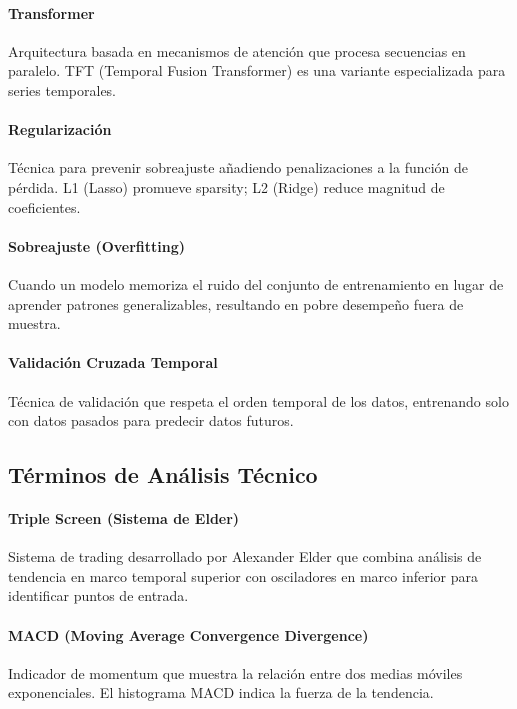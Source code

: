 \documentclass[11pt,a4paper]{article}
\begin{document}
\paragraph{Transformer} \label{glos:transformer}
Arquitectura basada en mecanismos de atención que procesa secuencias en paralelo. TFT (Temporal Fusion Transformer) es una variante especializada para series temporales.

\paragraph{Regularización} \label{glos:regularizacion}
Técnica para prevenir sobreajuste añadiendo penalizaciones a la función de pérdida. L1 (Lasso) promueve sparsity; L2 (Ridge) reduce magnitud de coeficientes.

\paragraph{Sobreajuste (Overfitting)} \label{glos:overfitting}
Cuando un modelo memoriza el ruido del conjunto de entrenamiento en lugar de aprender patrones generalizables, resultando en pobre desempeño fuera de muestra.

\paragraph{Validación Cruzada Temporal} \label{glos:cv-temporal}
Técnica de validación que respeta el orden temporal de los datos, entrenando solo con datos pasados para predecir datos futuros.

\subsection*{Términos de Análisis Técnico}

\paragraph{Triple Screen (Sistema de Elder)} \label{glos:triple-screen}
Sistema de trading desarrollado por Alexander Elder que combina análisis de tendencia en marco temporal superior con osciladores en marco inferior para identificar puntos de entrada.

\paragraph{MACD (Moving Average Convergence Divergence)} \label{glos:macd}
Indicador de momentum que muestra la relación entre dos medias móviles exponenciales. El histograma MACD indica la fuerza de la tendencia.
\end{document}
